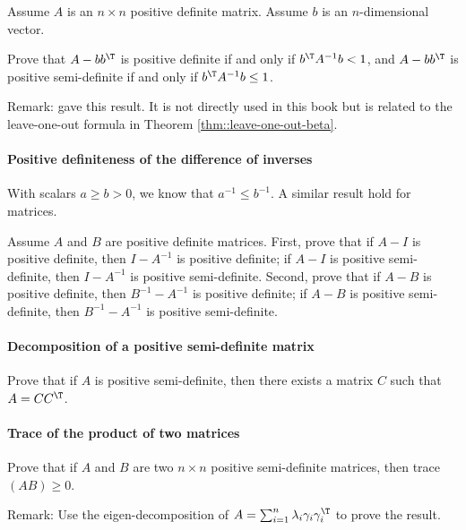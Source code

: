 Assume $A$ is an $n\times n$ positive definite matrix. Assume $b$ is an $n$-dimensional vector. 

Prove that $A - bb^{\T}$ is positive definite if and only if $b^{\T} A^{-1} b <1$, and  $A - bb^{\T}$ is positive semi-definite if and only if $b^{\T} A^{-1} b \leq 1$. 



Remark: \citet[][Appendix]{farebrother1976further} gave this result. It is not directly used in this book but is related to the leave-one-out formula in Theorem \ref{thm::leave-one-out-beta}. 





\paragraph{Positive definiteness of the difference of inverses}\label{hwmath::psd-diff-inverse}


With scalars $a \geq  b > 0$, we know that $a^{-1} \leq b^{-1}$. A similar result hold for matrices. 


Assume $A$ and $B$ are positive definite matrices. First, prove that if $A - I$ is positive definite, then $ I-  A^{-1}$ is positive definite; if $A - I$ is positive semi-definite, then $ I-  A^{-1}$ is positive semi-definite.
Second, prove that if $A - B$ is positive definite, then $ B^{-1} -  A^{-1}$ is positive definite; if $A - B$ is positive semi-definite, then $ B^{-1} -  A^{-1}$ is positive semi-definite. 






\paragraph{Decomposition of a positive semi-definite matrix}\label{hwmath::decompose-psd}

Prove that if $A$ is positive semi-definite, then there exists a matrix $C$ such that $A = CC^{\T}$. 



\paragraph{Trace of the product of two matrices}
\label{hwmath1::trace-product}
Prove that if $A$ and $B$ are two $n\times n$ positive semi-definite matrices, then trace$(AB) \geq 0.$



Remark: 
Use the eigen-decomposition of $A = \sum_{i=1}^n \lambda_i \gamma_i \gamma_i^{\T}$ to prove the result. 

